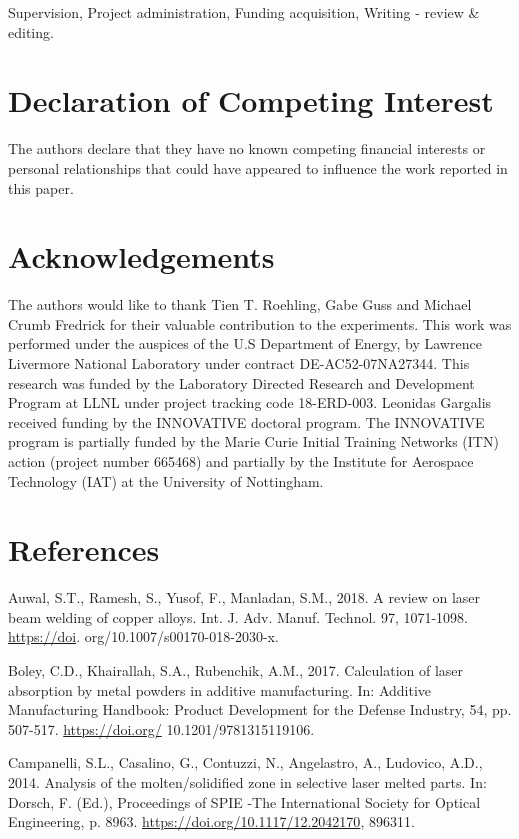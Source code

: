 \documentclass[10pt]{article}
\begin{document}
Supervision, Project administration, Funding acquisition, Writing - review \& editing.

\section*{Declaration of Competing Interest}
The authors declare that they have no known competing financial interests or personal relationships that could have appeared to influence the work reported in this paper.

\section*{Acknowledgements}
The authors would like to thank Tien T. Roehling, Gabe Guss and Michael Crumb Fredrick for their valuable contribution to the experiments. This work was performed under the auspices of the U.S Department of Energy, by Lawrence Livermore National Laboratory under contract DE-AC52-07NA27344. This research was funded by the Laboratory Directed Research and Development Program at LLNL under project tracking code 18-ERD-003. Leonidas Gargalis received funding by the INNOVATIVE doctoral program. The INNOVATIVE program is partially funded by the Marie Curie Initial Training Networks (ITN) action (project number 665468) and partially by the Institute for Aerospace Technology (IAT) at the University of Nottingham.

\section*{References}
Auwal, S.T., Ramesh, S., Yusof, F., Manladan, S.M., 2018. A review on laser beam welding of copper alloys. Int. J. Adv. Manuf. Technol. 97, 1071-1098. \href{https://doi}{https://doi}. org/10.1007/s00170-018-2030-x.

Boley, C.D., Khairallah, S.A., Rubenchik, A.M., 2017. Calculation of laser absorption by metal powders in additive manufacturing. In: Additive Manufacturing Handbook: Product Development for the Defense Industry, 54, pp. 507-517. \href{https://doi.org/}{https://doi.org/} 10.1201/9781315119106.

Campanelli, S.L., Casalino, G., Contuzzi, N., Angelastro, A., Ludovico, A.D., 2014. Analysis of the molten/solidified zone in selective laser melted parts. In: Dorsch, F. (Ed.), Proceedings of SPIE -The International Society for Optical Engineering, p. 8963. \href{https://doi.org/10.1117/12.2042170}{https://doi.org/10.1117/12.2042170}, 896311.
\end{document}
